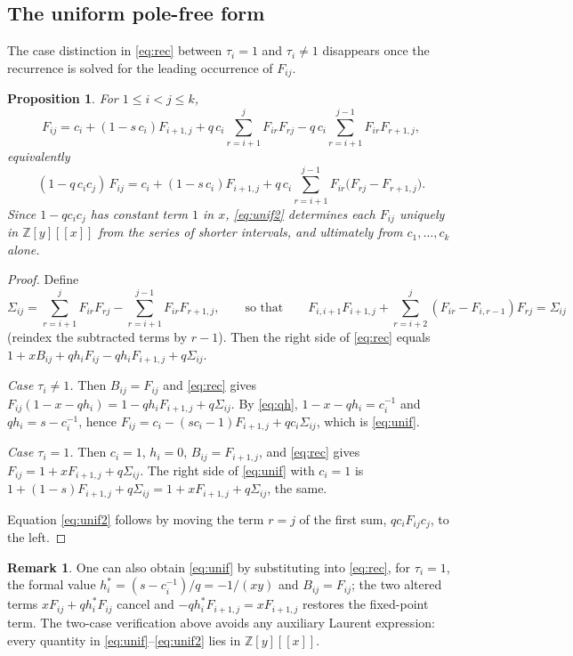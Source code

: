 \documentclass[11pt]{amsart}
\newtheorem{proposition}[theorem]{Proposition}
\theoremstyle{definition}
\newtheorem{remark}[theorem]{Remark}
\newcommand{\Z}{\mathbb{Z}}
\begin{document}
\subsection{The uniform pole-free form}
The case distinction in \eqref{eq:rec} between $\tau_i=1$ and $\tau_i\ne1$ disappears once the recurrence is solved for the leading occurrence of $F_{ij}$.

\begin{proposition}\label{prop:unif}
For $1\le i<j\le k$,
\begin{equation}\label{eq:unif}
F_{ij}=c_i+(1-s\,c_i)F_{i+1,j}+q\,c_i\sum_{r=i+1}^{j}F_{ir}F_{rj}-q\,c_i\sum_{r=i+1}^{j-1}F_{ir}F_{r+1,j},
\end{equation}
equivalently
\begin{equation}\label{eq:unif2}
(1-q\,c_ic_j)\,F_{ij}=c_i+(1-s\,c_i)F_{i+1,j}+q\,c_i\sum_{r=i+1}^{j-1}F_{ir}\bigl(F_{rj}-F_{r+1,j}\bigr).
\end{equation}
Since $1-qc_ic_j$ has constant term $1$ in $x$, \eqref{eq:unif2} determines each $F_{ij}$ uniquely in $\Z[y][[x]]$ from the series of shorter intervals, and ultimately from $c_1,\dots,c_k$ alone.
\end{proposition}

\begin{proof}
Define
\[
\Sigma_{ij}=\sum_{r=i+1}^{j}F_{ir}F_{rj}-\sum_{r=i+1}^{j-1}F_{ir}F_{r+1,j},
\qquad\text{so that}\qquad
F_{i,i+1}F_{i+1,j}+\sum_{r=i+2}^{j}(F_{ir}-F_{i,r-1})F_{rj}=\Sigma_{ij}
\]
(reindex the subtracted terms by $r-1$). Then the right side of \eqref{eq:rec} equals $1+xB_{ij}+qh_iF_{ij}-qh_iF_{i+1,j}+q\Sigma_{ij}$.

\emph{Case $\tau_i\ne1$.} Then $B_{ij}=F_{ij}$ and \eqref{eq:rec} gives $F_{ij}(1-x-qh_i)=1-qh_iF_{i+1,j}+q\Sigma_{ij}$. By \eqref{eq:qh}, $1-x-qh_i=c_i^{-1}$ and $qh_i=s-c_i^{-1}$, hence $F_{ij}=c_i-(sc_i-1)F_{i+1,j}+qc_i\Sigma_{ij}$, which is \eqref{eq:unif}.

\emph{Case $\tau_i=1$.} Then $c_i=1$, $h_i=0$, $B_{ij}=F_{i+1,j}$, and \eqref{eq:rec} gives $F_{ij}=1+xF_{i+1,j}+q\Sigma_{ij}$. The right side of \eqref{eq:unif} with $c_i=1$ is $1+(1-s)F_{i+1,j}+q\Sigma_{ij}=1+xF_{i+1,j}+q\Sigma_{ij}$, the same.

Equation \eqref{eq:unif2} follows by moving the term $r=j$ of the first sum, $qc_iF_{ij}c_j$, to the left.
\end{proof}

\begin{remark}\label{rem:hstar}
One can also obtain \eqref{eq:unif} by substituting into \eqref{eq:rec}, for $\tau_i=1$, the formal value $h_i^*=(s-c_i^{-1})/q=-1/(xy)$ and $B_{ij}=F_{ij}$; the two altered terms $xF_{ij}+qh_i^*F_{ij}$ cancel and $-qh_i^*F_{i+1,j}=xF_{i+1,j}$ restores the fixed-point term. The two-case verification above avoids any auxiliary Laurent expression: every quantity in \eqref{eq:unif}--\eqref{eq:unif2} lies in $\Z[y][[x]]$.
\end{remark}
\end{document}
